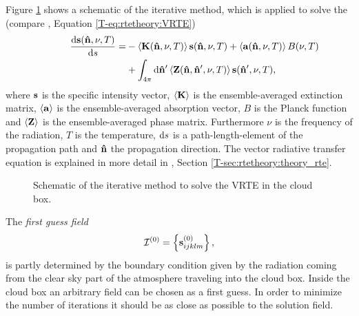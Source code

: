 Figure \ref{fig:scattering:iteration_scheme} shows a schematic of the iterative
method, which is applied to solve the  (compare \theory, Equation \ref{T-eq:rtetheory:VRTE})
\begin{eqnarray}
  \frac {\DiffD\StoVec(\PDir, \nu, T)}{\DiffD s} =
    &{}-\EnsAvr{\ExtMat(\PDir, \nu, T)} \StoVec(\PDir, \nu, T) +
    \EnsAvr{\AbsVec(\PDir, \nu, T)} \rlap{$B(\nu, T)$} \\
    &{}+ \int_{4\pi} \DiffD\PDir' \EnsAvr{\PhaMat(\PDir, \PDir', \nu, T)} \StoVec(\PDir', \nu, T),
\end{eqnarray}
where ${\bf s}$ is the specific intensity vector, $\left\langle {\bf K} \right\rangle$
is the ensemble-averaged extinction matrix, $\left\langle {\bf a} \right\rangle$ is the
ensemble-averaged absorption vector, $B$ is the 
Planck function and $\left\langle {\bf Z} \right\rangle$ is the ensemble-averaged
phase matrix.  Furthermore $\nu$ is the frequency of the radiation,
$T$ is the temperature, $\mathrm{d} s$ is a path-length-element of the
propagation path and ${\bf \hat{n}}$ the propagation direction.
The vector radiative transfer equation is explained in more detail in
\theory, Section \ref{T-sec:rtetheory:theory_rte}. 


\begin{figure}[t!]
  \caption{Schematic of the iterative method to solve the VRTE in the cloud box.}
  \label{fig:scattering:iteration_scheme}
\end{figure}

The \emph{first guess field}
\begin{equation}
  {\mathcal I}^{(0)} = \left\{{\bf s}^{(0)}_{ijklm}\right\},
\end{equation}
is partly determined by the boundary condition given by the radiation
coming from the clear sky part of the atmosphere traveling into the
cloud box.  Inside the cloud box an arbitrary field can be chosen as a
first guess. In order to minimize the number of iterations it should
be as close as possible to the solution field.


